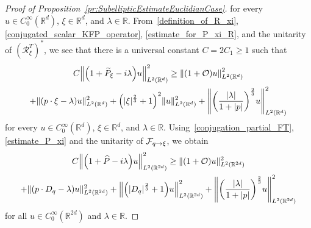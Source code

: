 \documentclass[10pt]{amsart}
\theoremstyle{definition}\newtheorem{defi}[theo]{Definition}\newtheorem{rema}[theo]{Remark}\newtheorem{exam}[theo]{Example}\newtheorem{exem}[theo]{Example}\newtheorem{nota}[theo]{Notation}
\newcommand{\R}{\mathbb{R}}
\newcommand{\clO}{\mathcal{O}}
\newcommand{\clR}{\mathcal{R}}
\newcommand{\clF}{\mathcal{F}}
\let\oldhat\hat
\renewcommand*{\hat}[1]{\mathchoice{\widehat{#1}}{\widehat{#1}}{\oldhat{#1}}{\oldhat{#1}}}
\let\originalleft\left
\let\originalright\right
\renewcommand{\left}{\mathopen{}\mathclose\bgroup\originalleft}
\renewcommand{\right}{\aftergroup\egroup\originalright}
\renewcommand*{\to}{\mathchoice{\longrightarrow}{\rightarrow}{\rightarrow}{\rightarrow}}
\begin{document}
\begin{proof}[{Proof of Proposition~\ref{pr:SubellipticEstimateEuclidianCase}}]
for every $u \in C^\infty_0(\R^d)$, $\xi \in \R^d$, and $\lambda \in \R$. From~\eqref{definition_of_R_xi}, \eqref{conjugated_scalar_KFP_operator}, \eqref{estimate_for_P_xi_R}, and the unitarity of $(\clR^T_\xi )^*$, we see that there is a universal constant $C=2C_1\geq 1$ such that
\begin{multline}\label{estimate_P_xi}
C\left\| \left(1+\widetilde{P}_{\xi}-i\lambda\right)u \right\|^{2}_{L^2(\R^d)} \geq \left\| (1+\clO)u\right\|^{2}_{L^2(\R^d)}\\
+ \| (p\cdot\xi -\lambda)u\|^{2}_{L^2(\R^d)}
+ \left(|\xi|^{\frac{2}{3}}+1\right)^{2}\|u\|^{2}_{L^2(\R^d)} +
\left\|
\left(
\frac{|\lambda|}{1+|p|}
\right)^{\frac{2}{3}} u
\right\|^{2}_{L^2(\R^d)}
\end{multline}
for every $u \in C^\infty_0(\R^d)$, $\xi \in \R^d$, and $\lambda \in \R$. Using~\eqref{conjugation_partial_FT}, \eqref{estimate_P_xi} and the unitarity of $\clF_{q\to\xi}$, we obtain
\begin{multline*}
C\left\|\left(1+\hat{P}-i\lambda\right)u\right\|^{2}_{L^2(\R^{2d})} \geq \| (1+\clO)u\|^{2}_{L^2(\R^{2d})}\\
+ \| (p\cdot D_{q}-\lambda)u\|^{2}_{L^2(\R^{2d})}
+ \left\|\left(|D_{q}|^{\frac{2}{3}}+1\right)u\right\|^{2}_{L^2(\R^{2d})} +
\left\|
\left(
\frac{|\lambda|}{1+|p|}
\right)^{\frac{2}{3}} u
\right\|^{2}_{L^2(\R^{2d})}
\end{multline*}
for all $u \in C^\infty_0(\R^{2d})$ and $\lambda \in \R$.


\end{proof}
\end{document}

